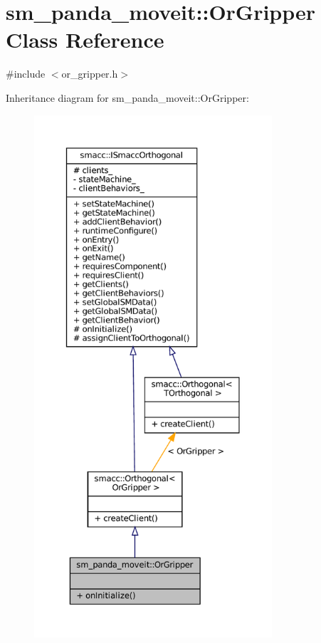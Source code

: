 \hypertarget{classsm__panda__moveit_1_1OrGripper}{}\section{sm\+\_\+panda\+\_\+moveit\+:\+:Or\+Gripper Class Reference}
\label{classsm__panda__moveit_1_1OrGripper}


{\ttfamily \#include $<$or\+\_\+gripper.\+h$>$}



Inheritance diagram for sm\+\_\+panda\+\_\+moveit\+:\+:Or\+Gripper\+:
\nopagebreak
\begin{figure}[H]
\begin{center}
\leavevmode
\includegraphics[height=550pt]{classsm__panda__moveit_1_1OrGripper__inherit__graph}
\end{center}
\end{figure}


